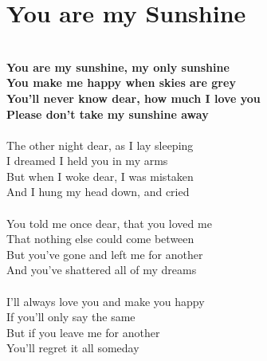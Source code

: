 \documentclass[letterpaper,9pt]{article}
\begin{document}
\section{You are my Sunshine}
\noindent
\\\textbf{You are my sunshine, my only sunshine
\\You make me happy when skies are grey
\\You'll never know dear, how much I love you
\\Please don't take my sunshine away}
\\
\\The other night dear, as  I lay sleeping
\\I dreamed I held you in my arms
\\But when I woke dear, I was mistaken
\\And I hung my head down, and cried
\\
\\You told me once dear, that you loved me
\\That nothing else could come between
\\But you've gone and left me for another
\\And you've shattered all of my dreams
\\
\\I'll always love you and make you happy 
\\If you'll only say the same
\\But if you leave me for another
\\You'll regret it all someday
\end{document}
